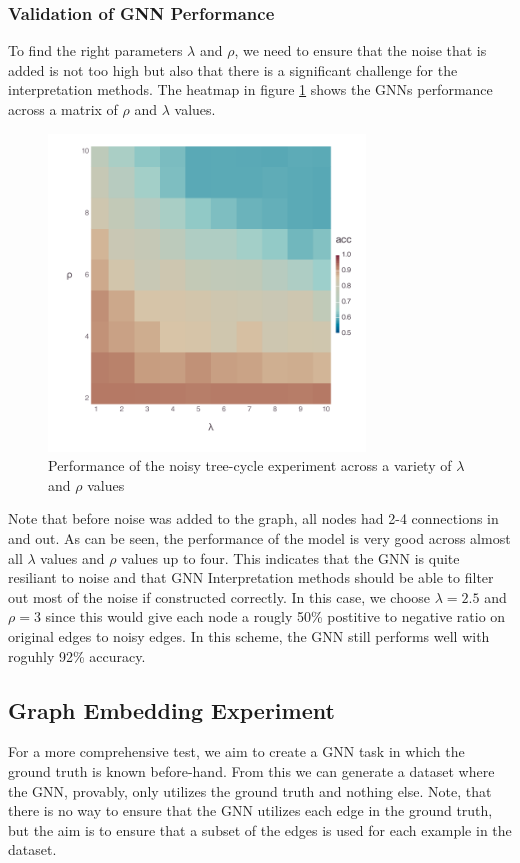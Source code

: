 \subsubsection{Validation of GNN Performance}
To find the right parameters $\lambda$ and $\rho$, we need to ensure that the noise that is added is not too high but also that there is a significant challenge for the interpretation methods. The heatmap in figure \ref{fig:gnn-deg} shows the GNNs performance across a matrix of $\rho$ and $\lambda$ values.
\begin{figure}[h]
	\centering
	\includegraphics[width=0.75\textwidth]{images/gnn-noise-deg.pdf}
	\caption{Performance of the noisy tree-cycle experiment across a variety of $\lambda$ and $\rho$ values}
	\label{fig:gnn-deg}
\end{figure}

Note that before noise was added to the graph, all nodes had 2-4 connections in and out. As can be seen, the performance of the model is very good across almost all $\lambda$ values and $\rho$ values up to four. This indicates that the GNN is quite resiliant to noise and that GNN Interpretation methods should be able to filter out most of the noise if constructed correctly. In this case, we choose $\lambda = 2.5$ and $\rho = 3$ since this would give each node a rougly 50\% postitive to negative ratio on original edges to noisy edges. In this scheme, the GNN still performs well with roguhly 92\% accuracy.

\subsection{Graph Embedding Experiment}
For a more comprehensive test, we aim to create a GNN task in which the ground truth is known before-hand. From this we can generate a dataset where the GNN, provably, only utilizes the ground truth and nothing else. Note, that there is no way to ensure that the GNN utilizes each edge in the ground truth, but the aim is to ensure that a subset of the edges is used for each example in the dataset.

